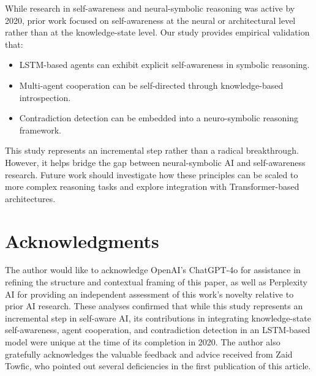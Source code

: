 \documentclass{article}
\begin{document}
While research in self-awareness and neural-symbolic reasoning was active by 2020, prior work focused on self-awareness at the neural or architectural level rather than at the knowledge-state level. Our study provides empirical validation that:
\begin{itemize}
    \item LSTM-based agents can exhibit explicit self-awareness in symbolic reasoning.
    \item Multi-agent cooperation can be self-directed through knowledge-based introspection.
    \item Contradiction detection can be embedded into a neuro-symbolic reasoning framework.
\end{itemize}

This study represents an incremental step rather than a radical breakthrough. However, it helps bridge the gap between neural-symbolic AI and self-awareness research. Future work should investigate how these principles can be scaled to more complex reasoning tasks and explore integration with Transformer-based architectures.

\section{Acknowledgments}

The author would like to acknowledge OpenAI’s ChatGPT-4o for assistance in refining the structure and contextual framing of this paper, as well as Perplexity AI for providing an independent assessment of this work’s novelty relative to prior AI research. These analyses confirmed that while this study represents an incremental step in self-aware AI, its contributions in integrating knowledge-state self-awareness, agent cooperation, and contradiction detection in an LSTM-based model were unique at the time of its completion in 2020.
The author also gratefully acknowledges the valuable feedback and advice received from Zaid Towfic, who pointed out several deficiencies in the first publication of this article.




\end{document}
